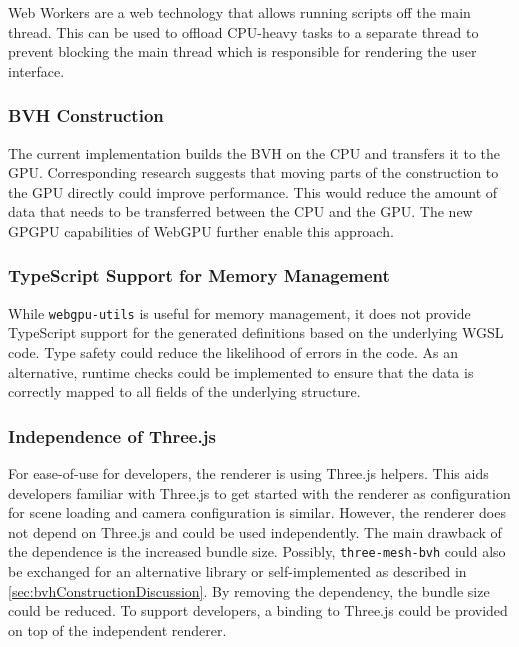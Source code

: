 Web Workers are a web technology that allows running scripts off the main thread. This can be used to offload \gls{CPU}-heavy tasks to a separate thread to prevent blocking the main thread which is responsible for rendering the user interface.

\subsubsection*{BVH Construction}
\label{sec:bvhConstructionDiscussion}

The current implementation builds the \gls{BVH} on the \gls{CPU} and transfers it to the \gls{GPU}. Corresponding research \cite{lauterbach2009GPUbvh} suggests that moving parts of the construction to the \gls{GPU} directly could improve performance. This would reduce the amount of data that needs to be transferred between the \gls{CPU} and the \gls{GPU}. The new \gls{GPGPU} capabilities of \gls{WebGPU} further enable this approach.

\subsubsection*{TypeScript Support for Memory Management}

While \texttt{webgpu-utils} \cite{webgpuUtilsLib} is useful for memory management, it does not provide TypeScript support for the generated definitions based on the underlying \gls{WGSL} code. Type safety could reduce the likelihood of errors in the code. As an alternative, runtime checks could be implemented to ensure that the data is correctly mapped to all fields of the underlying structure.

\subsubsection*{Independence of Three.js}

For ease-of-use for developers, the renderer is using \gls{Three.js} helpers. This aids developers familiar with \gls{Three.js} to get started with the renderer as configuration for scene loading and camera configuration is similar. However, the renderer does not depend on \gls{Three.js} and could be used independently. The main drawback of the dependence is the increased bundle size. Possibly, \texttt{three-mesh-bvh} \cite{threeMeshBvh} could also be exchanged for an alternative library or self-implemented as described in \autoref{sec:bvhConstructionDiscussion}. By removing the dependency, the bundle size could be reduced. To support developers, a binding to \gls{Three.js} could be provided on top of the independent renderer.


